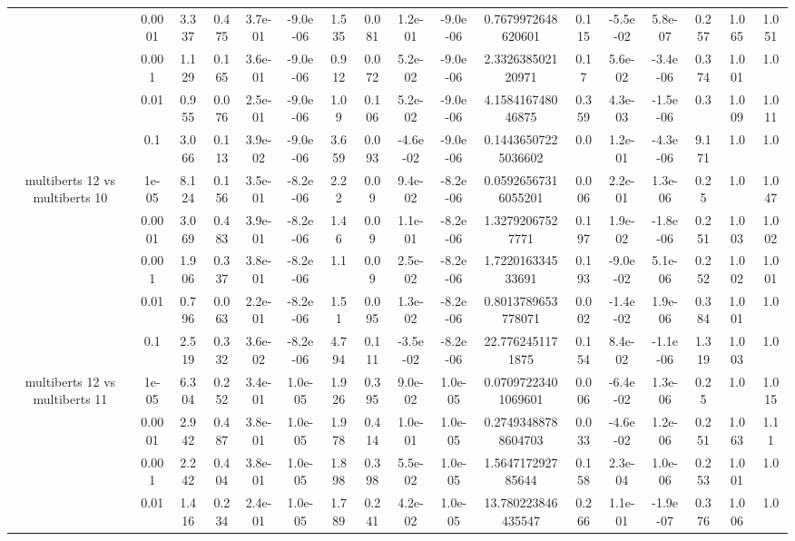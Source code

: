 \begin{tabular}{|c|c|c|c|c|c|c|c|c|c|c|c|c|c|c|c|c|}
 & 0.0001 & 3.337 & 0.475 & 3.7e-01 & -9.0e-06 & 1.535 & 0.081 & 1.2e-01 & -9.0e-06 & 0.7679972648620601 & 0.115 & -5.5e-02 & 5.8e-07 & 0.257 & 1.065 & 1.051 \\
 & 0.001 & 1.129 & 0.165 & 3.6e-01 & -9.0e-06 & 0.912 & 0.072 & 5.2e-02 & -9.0e-06 & 2.332638502120971 & 0.17 & 5.6e-02 & -3.4e-06 & 0.374 & 1.001 & 1.0 \\
 & 0.01 & 0.955 & 0.076 & 2.5e-01 & -9.0e-06 & 1.09 & 0.106 & 5.2e-02 & -9.0e-06 & 4.158416748046875 & 0.359 & 4.3e-03 & -1.5e-06 & 0.3 & 1.009 & 1.011 \\
 & 0.1 & 3.066 & 0.113 & 3.9e-02 & -9.0e-06 & 3.659 & 0.093 & -4.6e-02 & -9.0e-06 & 0.14436507225036602 & 0.0 & 1.2e-01 & -4.3e-06 & 9.171 & 1.0 & 1.0 \\
\hline
\multirow{5}{*}{multiberts 12 vs multiberts 10} & 1e-05 & 8.124 & 0.156 & 3.5e-01 & -8.2e-06 & 2.22 & 0.09 & 9.4e-02 & -8.2e-06 & 0.05926567316055201 & 0.006 & 2.2e-01 & 1.3e-06 & 0.25 & 1.0 & 1.047 \\
 & 0.0001 & 3.069 & 0.483 & 3.9e-01 & -8.2e-06 & 1.46 & 0.09 & 1.1e-01 & -8.2e-06 & 1.32792067527771 & 0.197 & 1.9e-02 & -1.8e-06 & 0.251 & 1.003 & 1.002 \\
 & 0.001 & 1.906 & 0.337 & 3.8e-01 & -8.2e-06 & 1.1 & 0.09 & 2.5e-02 & -8.2e-06 & 1.722016334533691 & 0.193 & -9.0e-02 & 5.1e-06 & 0.252 & 1.002 & 1.001 \\
 & 0.01 & 0.796 & 0.063 & 2.2e-01 & -8.2e-06 & 1.51 & 0.095 & 1.3e-02 & -8.2e-06 & 0.8013789653778071 & 0.002 & -1.4e-02 & 1.9e-06 & 0.384 & 1.001 & 1.0 \\
 & 0.1 & 2.519 & 0.332 & 3.6e-02 & -8.2e-06 & 4.794 & 0.111 & -3.5e-02 & -8.2e-06 & 22.7762451171875 & 0.154 & 8.4e-02 & -1.1e-06 & 1.319 & 1.003 & 1.0 \\
\hline
\multirow{5}{*}{multiberts 12 vs multiberts 11} & 1e-05 & 6.304 & 0.252 & 3.4e-01 & 1.0e-05 & 1.926 & 0.395 & 9.0e-02 & 1.0e-05 & 0.07097223401069601 & 0.006 & -6.4e-02 & 1.3e-06 & 0.25 & 1.0 & 1.015 \\
 & 0.0001 & 2.942 & 0.487 & 3.8e-01 & 1.0e-05 & 1.978 & 0.414 & 1.0e-01 & 1.0e-05 & 0.27493488788604703 & 0.033 & -4.6e-02 & 1.2e-06 & 0.251 & 1.063 & 1.11 \\
 & 0.001 & 2.242 & 0.404 & 3.8e-01 & 1.0e-05 & 1.898 & 0.398 & 5.5e-02 & 1.0e-05 & 1.564717292785644 & 0.158 & 2.3e-04 & 1.0e-06 & 0.253 & 1.001 & 1.0 \\
 & 0.01 & 1.416 & 0.234 & 2.4e-01 & 1.0e-05 & 1.789 & 0.241 & 4.2e-02 & 1.0e-05 & 13.780223846435547 & 0.266 & 1.1e-01 & -1.9e-07 & 0.376 & 1.006 & 1.0 \\

\end{tabular}
